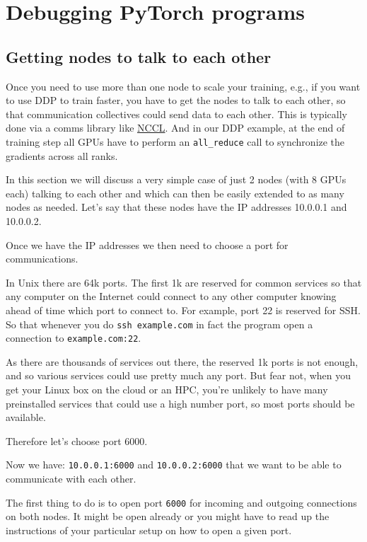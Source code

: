 \documentclass[
]{report}
\author{}
\date{2024-02-20}
\begin{document}
\chapter{Debugging PyTorch programs}\label{debugging-pytorch-programs}

\section{Getting nodes to talk to each
other}\label{getting-nodes-to-talk-to-each-other}

Once you need to use more than one node to scale your training, e.g., if
you want to use DDP to train faster, you have to get the nodes to talk
to each other, so that communication collectives could send data to each
other. This is typically done via a comms library like
\href{https://github.com/nVIDIA/nccl}{NCCL}. And in our DDP example, at
the end of training step all GPUs have to perform an
\texttt{all\_reduce} call to synchronize the gradients across all ranks.

In this section we will discuss a very simple case of just 2 nodes (with
8 GPUs each) talking to each other and which can then be easily extended
to as many nodes as needed. Let's say that these nodes have the IP
addresses 10.0.0.1 and 10.0.0.2.

Once we have the IP addresses we then need to choose a port for
communications.

In Unix there are 64k ports. The first 1k are reserved for common
services so that any computer on the Internet could connect to any other
computer knowing ahead of time which port to connect to. For example,
port 22 is reserved for SSH. So that whenever you do
\texttt{ssh\ example.com} in fact the program open a connection to
\texttt{example.com:22}.

As there are thousands of services out there, the reserved 1k ports is
not enough, and so various services could use pretty much any port. But
fear not, when you get your Linux box on the cloud or an HPC, you're
unlikely to have many preinstalled services that could use a high number
port, so most ports should be available.

Therefore let's choose port 6000.

Now we have: \texttt{10.0.0.1:6000} and \texttt{10.0.0.2:6000} that we
want to be able to communicate with each other.

The first thing to do is to open port \texttt{6000} for incoming and
outgoing connections on both nodes. It might be open already or you
might have to read up the instructions of your particular setup on how
to open a given port.
\end{document}
